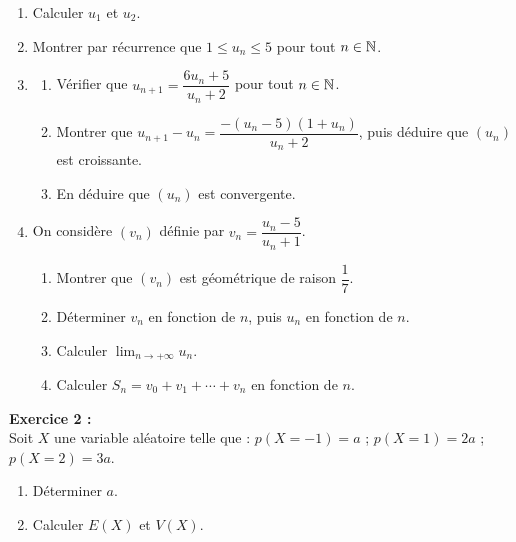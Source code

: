 \begin{enumerate}[leftmargin=1.5em, label=\textbf{\arabic*)}, itemsep=2pt, topsep=4pt]
  \item Calculer $u_1$ et $u_2$.
  \item Montrer par r\'{e}currence que $1 \leq u_n \leq 5$ pour tout $n \in \mathbb{N}$.
  \item
    \begin{enumerate}[label=\textbf{\alph*)}, itemsep=1pt, topsep=1pt]
      \item V\'{e}rifier que $u_{n+1} = \dfrac{6u_n + 5}{u_n + 2}$ pour tout $n \in \mathbb{N}$.
      \item Montrer que $u_{n+1} - u_n = \dfrac{-(u_n-5)(1+u_n)}{u_n+2}$,
            puis d\'{e}duire que $(u_n)$ est croissante.
      \item En d\'{e}duire que $(u_n)$ est convergente.
    \end{enumerate}
  \item On consid\`{e}re $(v_n)$ d\'{e}finie par $v_n = \dfrac{u_n - 5}{u_n + 1}$.
    \begin{enumerate}[label=\textbf{\alph*)}, itemsep=1pt, topsep=1pt]
      \item Montrer que $(v_n)$ est g\'{e}om\'{e}trique de raison $\dfrac{1}{7}$.
      \item D\'{e}terminer $v_n$ en fonction de $n$, puis $u_n$ en fonction de $n$.
      \item Calculer $\displaystyle\lim_{n \to +\infty} u_n$.
      \item Calculer $S_n = v_0 + v_1 + \cdots + v_n$ en fonction de $n$.
    \end{enumerate}
\end{enumerate}

\medskip

\noindent\textbf{Exercice 2 :}\\
Soit $X$ une variable al\'{e}atoire telle que :
$p(X=-1)=a$ ; $p(X=1)=2a$ ; $p(X=2)=3a$.

\begin{enumerate}[leftmargin=1.5em, label=\textbf{\arabic*.}, itemsep=2pt, topsep=4pt]
  \item D\'{e}terminer $a$.
  \item Calculer $E(X)$ et $V(X)$.
\end{enumerate}

\medskip

